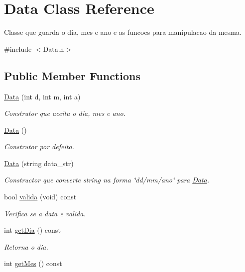 \hypertarget{class_data}{}\section{Data Class Reference}
\label{class_data}


Classe que guarda o dia, mes e ano e as funcoes para manipulacao da mesma.  




{\ttfamily \#include $<$Data.\+h$>$}

\subsection*{Public Member Functions}
\begin{DoxyCompactItemize}
\item 
\hyperlink{class_data_ab19ff9142aad6f03e1a8be8284d9e8fa}{Data} (int d, int m, int a)
\begin{DoxyCompactList}\small\item\em Construtor que aceita o dia, mes e ano. \end{DoxyCompactList}\item 
\hyperlink{class_data_af11f741cb7f587e2e495452a8905a22a}{Data} ()
\begin{DoxyCompactList}\small\item\em Construtor por defeito. \end{DoxyCompactList}\item 
\hyperlink{class_data_aeddc16ade8663cd89c17624b80a67d4f}{Data} (string data\+\_\+str)
\begin{DoxyCompactList}\small\item\em Constructor que converte string na forma \char`\"{}dd/mm/ano\char`\"{} para \hyperlink{class_data}{Data}. \end{DoxyCompactList}\item 
bool \hyperlink{class_data_af16b870e20e2993ad585a01407efb8d5}{valida} (void) const
\begin{DoxyCompactList}\small\item\em Verifica se a data e valida. \end{DoxyCompactList}\item 
int \hyperlink{class_data_aa9b7bdc683d9c493d903184e85f1e6b3}{get\+Dia} () const
\begin{DoxyCompactList}\small\item\em Retorna o dia. \end{DoxyCompactList}\item 
int \hyperlink{class_data_a1df6f5e1695c7cae56b9ee752a6895e8}{get\+Mes} () const

\end{DoxyCompactItemize}
